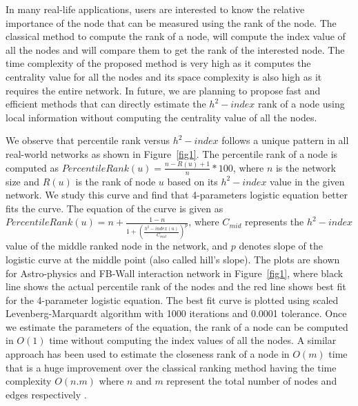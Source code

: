 \documentclass[12pt,3p]{article}
\begin{document}
In many real-life applications, users are interested to know the relative importance of the node that can be measured using the rank of the node. The classical method to compute the rank of a node, will compute the index value of all the nodes and will compare them to get the rank of the interested node. The time complexity of the proposed method is very high as it computes the centrality value for all the nodes and its space complexity is also high as it requires the entire network. In future, we are planning to propose fast and efficient methods that can directly estimate the $h^2-index$ rank of a node using local information without computing the centrality value of all the nodes. 

We observe that percentile rank versus $h^2-index$ follows a unique pattern in all real-world networks as shown in Figure~\ref{fig1}. The percentile rank of a node is computed as $PercentileRank(u)=\frac{n-R(u)+1}{n}*100$, where $n$ is the network size and $R(u)$ is the rank of node $u$ based on its $h^2-index$ value in the given network. We study this curve and find that 4-parameters logistic equation better fits the curve. The equation of the curve is given as $PercentileRank(u) = n + \frac{1-n}{1+\left( \frac{h^2-index(u)}{C_{mid}}\right) ^p}$, where $C_{mid}$ represents the $h^2-index$ value of the middle ranked node in the network, and $p$ denotes slope of the logistic curve at the middle point (also called hill's slope). The plots are shown for Astro-physics and FB-Wall interaction network in Figure~\ref{fig1}, where black line shows the actual percentile rank of the nodes and the red line shows best fit for the 4-parameter logistic equation. The best fit curve is plotted using scaled Levenberg-Marquardt algorithm \cite{more1978levenberg} with 1000 iterations and 0.0001 tolerance. Once we estimate the parameters of the equation, the rank of a node can be computed in $O(1)$ time without computing the index values of all the nodes. A similar approach has been used to estimate the closeness rank of a node in $O(m)$ time that is a huge improvement over the classical ranking method having the time complexity $O(n.m)$ where $n$ and $m$ represent the total number of nodes and edges respectively \cite{saxena2017afaster}.
\end{document}
